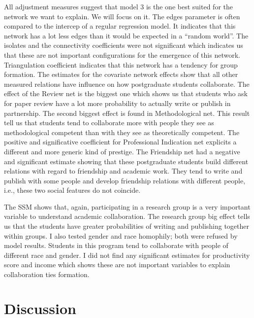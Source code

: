 \documentclass[12pt, english]{article}
\begin{document}
\begin{table}[!h]
\end{table}

All adjustment measures suggest that model 3 is the one best suited for the network we want to explain. We will focus on it. The edges parameter is often compared to the intercep of a regular regression model. It indicates that this network has a lot less edges than it would be expected in a ``random world''. The isolates and the connectivity coefficients were not significant which indicates us that these are not important configurations for the emergence of this network. Triangulation coefficient indicates that this network has a tendency for group formation. The estimates for the covariate network effects show that all other measured relations have influence on how postgraduate students collaborate. The effect of the Review net is the biggest one which shows us that students who ask for paper review have a lot more probability to actually write or publish in partnership. The second biggest effect is found in Methodological net. This result tell us that students tend to collaborate more with people they see as methodological competent than with they see as theoretically competent. The positive and significative coefficient for Professional Indication net explicits a different and more generic kind of prestige. The Friendship net had a negative and significant estimate showing that these postgraduate students build different relations with regard to friendship and academic work. They tend to write and publish with some people and develop friendship relations with different people, i.e., these two social features do not coincide.

The SSM shows that, again, participating in a research group is a very important variable to understand academic collaboration. The research group big effect tells us that the students have greater probabilities of writing and publishing together within groups. I also tested gender and race homophily; both were refused by model results. Students in this program tend to collaborate with people of different race and gender. I did not find any significant estimates for productivity score and income which shows these are not important variables to explain collaboration ties formation.


\section{Discussion}
\end{document}
